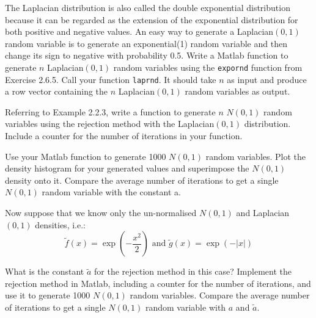 \begin{exercise}
The Laplacian distribution is also called the double exponential distribution because it can be regarded as the extension of the exponential distribution for both positive and negative values. An easy way to generate a Laplacian$(0, 1)$ random variable is to generate an exponential(1) random variable and then change its sign to negative with probability 0.5. Write a Matlab function to generate $n$ Laplacian$(0, 1)$ random variables using the {\tt expornd} function from Exercise 2.6.5. Call your function {\tt laprnd}. It should take $n$ as input and produce a row vector containing the $n$ Laplacian$(0, 1)$ random variables as output.
\end{exercise}

\begin{exercise}
\begin{asparaenum}[(a)]
\item	Referring to Example 2.2.3, write a \Matlab function to generate $n$ $N(0, 1)$ random variables using the rejection method with the Laplacian$(0, 1)$ distribution. Include a counter for the number of iterations in your function.

\item	Use your Matlab function to generate 1000 $N(0, 1)$ random variables. Plot the density histogram for your generated values and superimpose the $N(0, 1)$ density onto it. Compare the average number of iterations to get a single $N(0, 1)$ random variable with the constant a.

\item	Now suppose that we know only the un-normalised $N(0, 1)$ and Laplacian$(0, 1)$ densities, i.e.:
$$\tilde{f}(x)=\exp\left( -\frac{x^2}{2}\right)\textrm{ and }\tilde{g}(x)=\exp(-|x|)$$


What is the constant $\tilde{a}$ for the rejection method in this case? Implement the rejection method in Matlab, including a counter for the number of iterations, and use it to generate 1000 $N(0, 1)$ random variables. Compare the average number of iterations to get a single $N(0, 1)$ random variable with $a$ and $\tilde{a}$.
\end{asparaenum}
\end{exercise}

